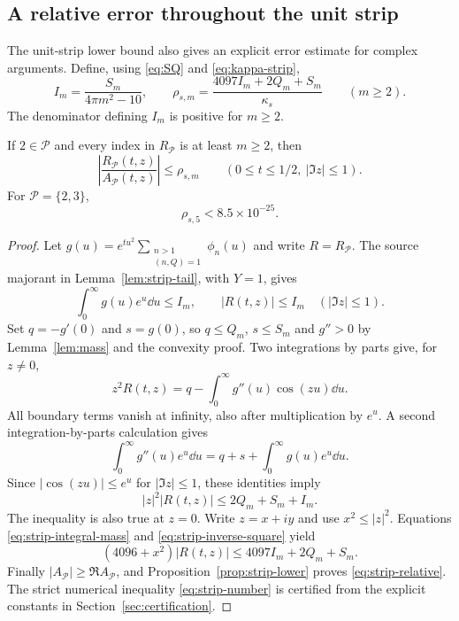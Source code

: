 \subsection{A relative error throughout the unit strip}

The unit-strip lower bound also gives an explicit error estimate for
complex arguments. Define, using \eqref{eq:SQ} and \eqref{eq:kappa-strip},
\begin{equation}\label{eq:strip-relative-constants}
 I_m=\frac{S_m}{4\pi m^2-10},\qquad
 \rho_{s,m}=\frac{4097I_m+2Q_m+S_m}{\kappa_s}
 \qquad(m\ge2).
\end{equation}
The denominator defining $I_m$ is positive for $m\ge2$.

\begin{theorem}\label{thm:strip-relative}
If $2\in\mathcal P$ and every index in $R_{\mathcal P}$ is at least
$m\ge2$, then
\begin{equation}\label{eq:strip-relative}
 \left|\frac{R_{\mathcal P}(t,z)}{A_{\mathcal P}(t,z)}\right|
 \le\rho_{s,m}
 \qquad(0\le t\le1/2,\ |\Im z|\le1).
\end{equation}
For $\mathcal P=\{2,3\}$,
\begin{equation}\label{eq:strip-number}
 \rho_{s,5}<8.5\times10^{-25}.
\end{equation}
\end{theorem}
\begin{proof}
Let $g(u)=e^{tu^2}\sum_{\substack{n>1\\(n,Q)=1}}\phi_n(u)$ and write
$R=R_{\mathcal P}$. The source majorant in
Lemma~\ref{lem:strip-tail}, with $Y=1$, gives
\begin{equation}\label{eq:strip-integral-mass}
 \int_0^\infty g(u)e^u\dd u\le I_m,\qquad |R(t,z)|\le I_m
 \quad(|\Im z|\le1).
\end{equation}
Set $q=-g'(0)$ and $s=g(0)$, so $q\le Q_m$, $s\le S_m$ and
$g''>0$ by Lemma~\ref{lem:mass} and the convexity proof. Two integrations
by parts give, for $z\ne0$,
\[
 z^2R(t,z)=q-\int_0^\infty g''(u)\cos(zu)\dd u.
\]
All boundary terms vanish at infinity, also after multiplication by
$e^u$. A second integration-by-parts calculation gives
\[
 \int_0^\infty g''(u)e^u\dd u
 =q+s+\int_0^\infty g(u)e^u\dd u.
\]
Since $|\cos(zu)|\le e^u$ for $|\Im z|\le1$, these identities imply
\begin{equation}\label{eq:strip-inverse-square}
 |z|^2|R(t,z)|\le2Q_m+S_m+I_m.
\end{equation}
The inequality is also true at $z=0$. Write $z=x+iy$ and use
$x^2\le|z|^2$. Equations \eqref{eq:strip-integral-mass} and
\eqref{eq:strip-inverse-square} yield
\[
 (4096+x^2)|R(t,z)|\le4097I_m+2Q_m+S_m.
\]
Finally $|A_{\mathcal P}|\ge\Re A_{\mathcal P}$, and
Proposition~\ref{prop:strip-lower} proves \eqref{eq:strip-relative}.
The strict numerical inequality \eqref{eq:strip-number} is certified
from the explicit constants in Section~\ref{sec:certification}.
\end{proof}

